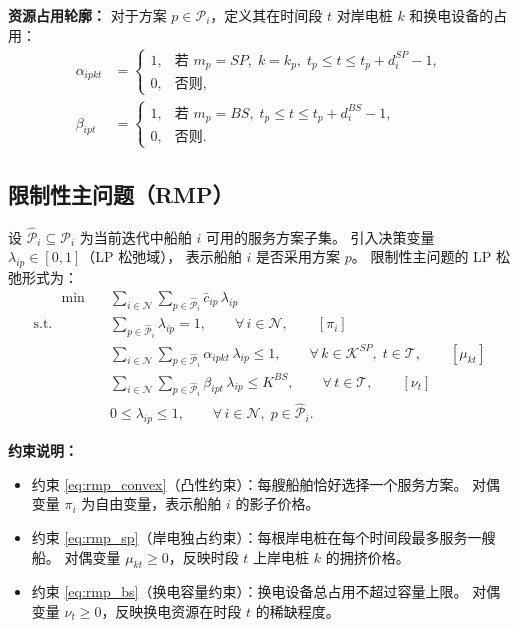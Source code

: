 \documentclass[UTF8, a4paper, 12pt]{ctexart}
\begin{document}
\medskip
\noindent\textbf{资源占用轮廓：}
对于方案 $p \in \mathcal{P}_i$，定义其在时间段 $t$ 对岸电桩 $k$ 和换电设备的占用：
\begin{align}
  \alpha_{ipkt} &=
  \begin{cases}
    1, & \text{若 } m_p = SP,\; k = k_p,\;
         t_p \le t \le t_p + d_i^{SP} - 1, \\
    0, & \text{否则},
  \end{cases}
  \label{eq:col_alpha} \\
  \beta_{ipt} &=
  \begin{cases}
    1, & \text{若 } m_p = BS,\;
         t_p \le t \le t_p + d_i^{BS} - 1, \\
    0, & \text{否则}.
  \end{cases}
  \label{eq:col_beta}
\end{align}

\subsection{限制性主问题（RMP）}
\label{sec:cg_rmp}

设 $\hat{\mathcal{P}}_i \subseteq \mathcal{P}_i$ 为当前迭代中船舶 $i$
可用的服务方案子集。
引入决策变量 $\lambda_{ip} \in [0,1]$（LP 松弛域），
表示船舶 $i$ 是否采用方案 $p$。
限制性主问题的 LP 松弛形式为：
\begin{align}
  [\text{RMP}] \qquad
  \min \quad & \sum_{i \in \mathcal{N}} \sum_{p \in \hat{\mathcal{P}}_i}
    \bar{c}_{ip}\, \lambda_{ip}
  \label{eq:rmp_obj} \\
  \text{s.t.} \quad
  & \sum_{p \in \hat{\mathcal{P}}_i} \lambda_{ip} = 1,
    \qquad \forall\, i \in \mathcal{N},
    \qquad [\pi_i]
  \label{eq:rmp_convex} \\
  & \sum_{i \in \mathcal{N}} \sum_{p \in \hat{\mathcal{P}}_i}
    \alpha_{ipkt}\, \lambda_{ip} \le 1,
    \qquad \forall\, k \in \mathcal{K}^{SP},\; t \in \mathcal{T},
    \qquad [\mu_{kt}]
  \label{eq:rmp_sp} \\
  & \sum_{i \in \mathcal{N}} \sum_{p \in \hat{\mathcal{P}}_i}
    \beta_{ipt}\, \lambda_{ip} \le K^{BS},
    \qquad \forall\, t \in \mathcal{T},
    \qquad [\nu_t]
  \label{eq:rmp_bs} \\
  & 0 \le \lambda_{ip} \le 1,
    \qquad \forall\, i \in \mathcal{N},\; p \in \hat{\mathcal{P}}_i.
  \label{eq:rmp_bound}
\end{align}

\noindent\textbf{约束说明：}
\begin{itemize}
  \item 约束 \eqref{eq:rmp_convex}（凸性约束）：每艘船舶恰好选择一个服务方案。
        对偶变量 $\pi_i$ 为自由变量，表示船舶 $i$ 的影子价格。
  \item 约束 \eqref{eq:rmp_sp}（岸电独占约束）：每根岸电桩在每个时间段最多服务一艘船。
        对偶变量 $\mu_{kt} \ge 0$，反映时段 $t$ 上岸电桩 $k$ 的拥挤价格。
  \item 约束 \eqref{eq:rmp_bs}（换电容量约束）：换电设备总占用不超过容量上限。
        对偶变量 $\nu_t \ge 0$，反映换电资源在时段 $t$ 的稀缺程度。
\end{itemize}
\end{document}
